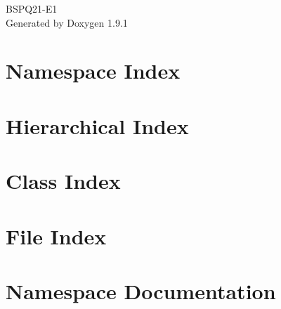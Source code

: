 \let\mypdfximage\pdfximage\def\pdfximage{\immediate\mypdfximage}\documentclass[twoside]{book}
\newcommand{\+}{\discretionary{\mbox{\scriptsize$\hookleftarrow$}}{}{}}
\newcommand{\clearemptydoublepage}{%
  \newpage{\pagestyle{empty}\cleardoublepage}%
}
\begin{document}
\raggedbottom

\hypersetup{pageanchor=false,
             bookmarksnumbered=true,
             pdfencoding=unicode
            }
\begin{titlepage}
\vspace*{7cm}
\begin{center}%
{\Large BSPQ21-\/\+E1 }\\
\vspace*{1cm}
{\large Generated by Doxygen 1.9.1}\\
\end{center}
\end{titlepage}
\clearemptydoublepage
{}
\tableofcontents
\clearemptydoublepage
{}
\hypersetup{pageanchor=true}

\chapter{Namespace Index}

\chapter{Hierarchical Index}

\chapter{Class Index}

\chapter{File Index}

\chapter{Namespace Documentation}










\end{document}
